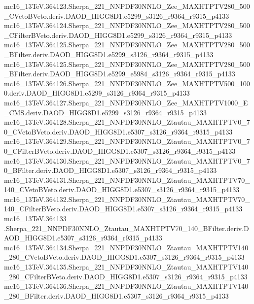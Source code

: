 \begin{footnotesize}
mc16\_13TeV.364123.Sherpa\_221\_NNPDF30NNLO\_Zee\_MAXHTPTV280\_500\_CVetoBVeto.deriv.DAOD\_HIGG8D1.e5299\_s3126\_r9364\_r9315\_p4133 \\
mc16\_13TeV.364124.Sherpa\_221\_NNPDF30NNLO\_Zee\_MAXHTPTV280\_500\_CFilterBVeto.deriv.DAOD\_HIGG8D1.e5299\_s3126\_r9364\_r9315\_p4133 \\
mc16\_13TeV.364125.Sherpa\_221\_NNPDF30NNLO\_Zee\_MAXHTPTV280\_500\_BFilter.deriv.DAOD\_HIGG8D1.e5299\_s3126\_r9364\_r9315\_p4133 \\
mc16\_13TeV.364125.Sherpa\_221\_NNPDF30NNLO\_Zee\_MAXHTPTV280\_500\_BFilter.deriv.DAOD\_HIGG8D1.e5299\_e5984\_s3126\_r9364\_r9315\_p4133 \\
mc16\_13TeV.364126.Sherpa\_221\_NNPDF30NNLO\_Zee\_MAXHTPTV500\_1000.deriv.DAOD\_HIGG8D1.e5299\_s3126\_r9364\_r9315\_p4133 \\
mc16\_13TeV.364127.Sherpa\_221\_NNPDF30NNLO\_Zee\_MAXHTPTV1000\_E\_CMS.deriv.DAOD\_HIGG8D1.e5299\_s3126\_r9364\_r9315\_p4133 \\
mc16\_13TeV.364128.Sherpa\_221\_NNPDF30NNLO\_Ztautau\_MAXHTPTV0\_70\_CVetoBVeto.deriv.DAOD\_HIGG8D1.e5307\_s3126\_r9364\_r9315\_p4133 \\
mc16\_13TeV.364129.Sherpa\_221\_NNPDF30NNLO\_Ztautau\_MAXHTPTV0\_70\_CFilterBVeto.deriv.DAOD\_HIGG8D1.e5307\_s3126\_r9364\_r9315\_p4133 \\
mc16\_13TeV.364130.Sherpa\_221\_NNPDF30NNLO\_Ztautau\_MAXHTPTV0\_70\_BFilter.deriv.DAOD\_HIGG8D1.e5307\_s3126\_r9364\_r9315\_p4133 \\
mc16\_13TeV.364131.Sherpa\_221\_NNPDF30NNLO\_Ztautau\_MAXHTPTV70\_140\_CVetoBVeto.deriv.DAOD\_HIGG8D1.e5307\_s3126\_r9364\_r9315\_p4133 \\
mc16\_13TeV.364132.Sherpa\_221\_NNPDF30NNLO\_Ztautau\_MAXHTPTV70\_140\_CFilterBVeto.deriv.DAOD\_HIGG8D1.e5307\_s3126\_r9364\_r9315\_p4133 \\
mc16\_13TeV.364133 \\.Sherpa\_221\_NNPDF30NNLO\_Ztautau\_MAXHTPTV70\_140\_BFilter.deriv.DAOD\_HIGG8D1.e5307\_s3126\_r9364\_r9315\_p4133 \\
mc16\_13TeV.364134.Sherpa\_221\_NNPDF30NNLO\_Ztautau\_MAXHTPTV140\_280\_CVetoBVeto.deriv.DAOD\_HIGG8D1.e5307\_s3126\_r9364\_r9315\_p4133 \\
mc16\_13TeV.364135.Sherpa\_221\_NNPDF30NNLO\_Ztautau\_MAXHTPTV140\_280\_CFilterBVeto.deriv.DAOD\_HIGG8D1.e5307\_s3126\_r9364\_r9315\_p4133 \\
mc16\_13TeV.364136.Sherpa\_221\_NNPDF30NNLO\_Ztautau\_MAXHTPTV140\_280\_BFilter.deriv.DAOD\_HIGG8D1.e5307\_s3126\_r9364\_r9315\_p4133 \\

\end{footnotesize}
